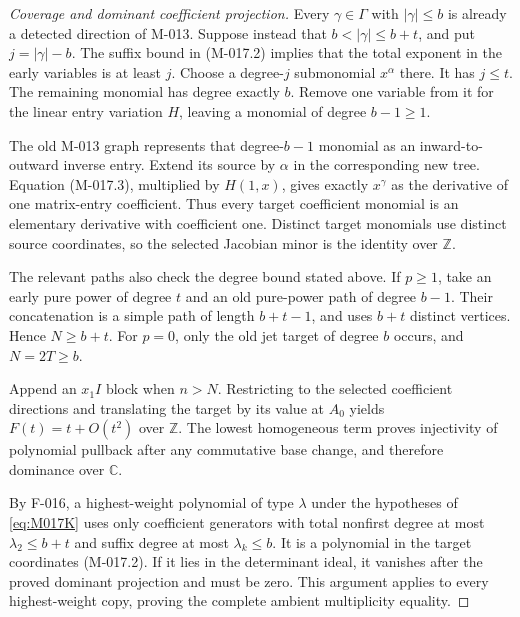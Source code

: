\begin{proof}[Coverage and dominant coefficient projection]
Every \(\gamma\in\Gamma\) with \(|\gamma|\leq b\)
is already a detected direction of M-013. Suppose instead
that \(b<|\gamma|\leq b+t\), and put
\(j=|\gamma|-b\). The suffix bound in (M-017.2)
implies that the total exponent in the early variables is
at least \(j\). Choose a degree-\(j\) submonomial
\(x^\alpha\) there. It has \(j\leq t\).
The remaining monomial has degree exactly \(b\).
Remove one variable from it for the linear entry variation
\(H\), leaving a monomial of degree \(b-1\geq1\).

The old M-013 graph represents that degree-\(b-1\)
monomial as an inward-to-outward inverse entry. Extend its
source by \(\alpha\) in the corresponding new tree.
Equation (M-017.3), multiplied by \(H(1,x)\), gives
exactly \(x^\gamma\) as the derivative of one matrix-entry
coefficient. Thus every target coefficient monomial is an
elementary derivative with coefficient one. Distinct target
monomials use distinct source coordinates, so the selected
Jacobian minor is the identity over \(\mathbb Z\).

The relevant paths also check the degree bound stated above.
If \(p\geq1\), take an early pure power of degree \(t\)
and an old pure-power path of degree \(b-1\).
Their concatenation is a simple path of length \(b+t-1\),
and uses \(b+t\) distinct vertices. Hence \(N\geq b+t\).
For \(p=0\), only the old jet target of degree \(b\)
occurs, and \(N=2T\geq b\).

Append an \(x_1I\) block when \(n>N\). Restricting
to the selected coefficient directions and translating the
target by its value at \(A_0\) yields \(F(t)=t+O(t^2)\)
over \(\mathbb Z\). The lowest homogeneous term proves
injectivity of polynomial pullback after any commutative
base change, and therefore dominance over \(\mathbb C\).

By F-016, a highest-weight polynomial of type \(\lambda\)
under the hypotheses of \eqref{eq:M017K} uses only
coefficient generators with total nonfirst degree at most
\(\lambda_2\leq b+t\) and suffix degree at most
\(\lambda_k\leq b\). It is a polynomial in the target
coordinates (M-017.2). If it lies in the determinant ideal,
it vanishes after the proved dominant projection and must
be zero. This argument applies to every highest-weight
copy, proving the complete ambient multiplicity equality.
\end{proof}

